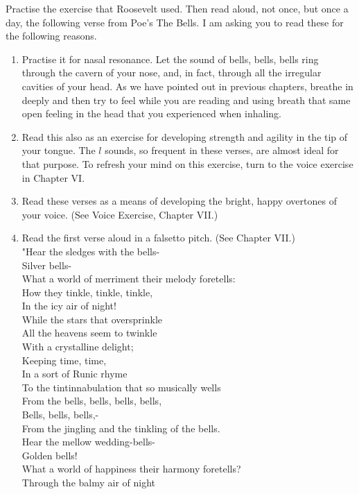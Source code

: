 \documentclass[10pt]{article}
\begin{document}
Practise the exercise that Roosevelt used. Then read aloud, not once, but once a day, the following verse from Poe's The Bells. I am asking you to read these for the following reasons.

\begin{enumerate}
  \item Practise it for nasal resonance. Let the sound of bells, bells, bells ring through the cavern of your nose, and, in fact, through all the irregular cavities of your head. As we have pointed out in previous chapters, breathe in deeply and then try to feel while you are reading and using breath that same open feeling in the head that you experienced when inhaling.
  \item Read this also as an exercise for developing strength and agility in the tip of your tongue. The $l$ sounds, so frequent in these verses, are almost ideal for that purpose. To refresh your mind on this exercise, turn to the voice exercise in Chapter VI.
  \item Read these verses as a means of developing the bright, happy overtones of your voice. (See Voice Exercise, Chapter VII.)
  \item Read the first verse aloud in a falsetto pitch. (See Chapter VII.)\\
"Hear the sledges with the bells-\\
Silver bells-\\
What a world of merriment their melody foretells:\\
How they tinkle, tinkle, tinkle,\\
In the icy air of night!\\
While the stars that oversprinkle\\
All the heavens seem to twinkle\\
With a crystalline delight;\\
Keeping time, time,\\
In a sort of Runic rhyme\\
To the tintinnabulation that so musically wells\\
From the bells, bells, bells, bells,\\
Bells, bells, bells,-\\
From the jingling and the tinkling of the bells.\\
Hear the mellow wedding-bells-\\
Golden bells!\\
What a world of happiness their harmony foretells?\\
Through the balmy air of night\\

\end{enumerate}
\end{document}
